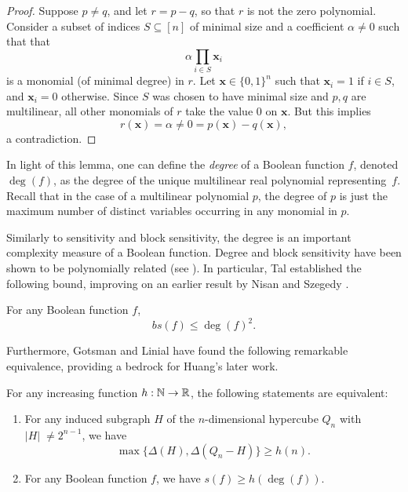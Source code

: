 \begin{proof}
    Suppose $p \ne q$, and let $r = p - q$, so that $r$ is not the zero polynomial. 
    Consider a subset of indices $S \subseteq [n]$ of minimal size and a coefficient $\alpha \ne 0$ such that that 
    \begin{equation*}
        \alpha \prod \limits_{i \in S} \bm{x}_i
    \end{equation*}
    is a monomial (of minimal degree) in $r$.
    Let $\bm{x} \in \{0, 1\}^n$ such that $\bm{x}_i = 1$ if $i \in S$, and $\bm{x}_i = 0$ otherwise.
    Since $S$ was chosen to have minimal size and $p, q$ are multilinear, all other monomials of $r$ take the value $0$ on $\bm{x}$.
    But this implies 
    \begin{equation*}
        r(\bm{x}) = \alpha \ne 0 = p(\bm{x}) - q(\bm{x}),
    \end{equation*}
    a contradiction.
\end{proof}

In light of this lemma, one can define the \textit{degree} of a Boolean function $f$, denoted $\deg(f)$, as the degree of the unique multilinear real polynomial \mbox{representing $f$}. 
Recall that in the case of a multilinear polynomial $p$, the degree of $p$ is just the maximum number of distinct variables occurring in any monomial in $p$.

Similarly to sensitivity and block sensitivity, the degree is an important complexity measure of a Boolean function. 
Degree and block sensitivity have been shown to be polynomially related (see \cite{buhrmanndewolf}).
In particular, Tal \cite{tal} established the following bound, improving on an earlier result by Nisan and Szegedy \cite{nisanszegedy}.
\begin{theorem} \label{thm:bs-lt-deg}
    For any Boolean function $f$, 
    \begin{equation*}
        bs(f) \le \deg (f)^2.
    \end{equation*}
\end{theorem}

Furthermore, Gotsman and Linial \cite{gotsmanlinial} have found the following remarkable equivalence, providing a bedrock for Huang's later work.

\begin{theorem} \label{thm:sensitivity-equivalence}
    For any increasing function $h: \mathbb{N} \rightarrow \mathbb{R}$, the following statements are equivalent:
    \begin{enumerate}
        \item For any induced subgraph $H$ of the $n$-dimensional hypercube $Q_n$ with $|H|\; \ne 2^{n - 1}$, we have
            \begin{equation*}
                \max \{\Delta(H), \Delta(Q_n - H) \} \ge h(n).
            \end{equation*}
        \item For any Boolean function $f$, we have $s(f) \ge h(\deg(f))$.
    \end{enumerate}
\end{theorem}

